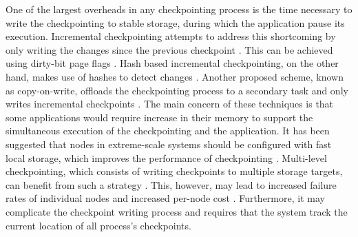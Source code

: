 One of the largest overheads in any checkpointing process is the time necessary to write the checkpointing 
to stable storage, during which the application pause its execution. Incremental checkpointing attempts
to address this shortcoming by only writing the changes since the previous checkpoint \cite{nam_ftc_1997,Agarwal:04:Adaptive}. This
can be achieved using dirty-bit page flags \cite{plank_ftcs_1994,elnozahy_1992_manetho}. Hash based incremental checkpointing, on the other
hand, makes use of hashes to detect changes \cite{nam_ftc_1997,Agarwal:04:Adaptive}. Another proposed scheme, known as copy-on-write,
offloads the checkpointing process to a secondary task and only writes incremental checkpoints \cite{li_trans_1994}.
The main concern of these techniques is that some applications would require increase in their
memory to support the simultaneous execution of the checkpointing and the application. It has been suggested that nodes in extreme-scale systems should be configured with fast local storage, which
improves the performance of checkpointing \cite{doe_ascr_exascale_2011}. Multi-level checkpointing, which consists of
writing checkpoints to multiple storage targets, can benefit from such a strategy \cite{Moody:10:SCR,hakkarine_2013}. This,
however, may lead to increased failure rates of individual nodes and increased per-node cost \cite{chen_2011_hystor}.
Furthermore, it may complicate the checkpoint writing process and requires that the system track the
current location of all process's checkpoints.


